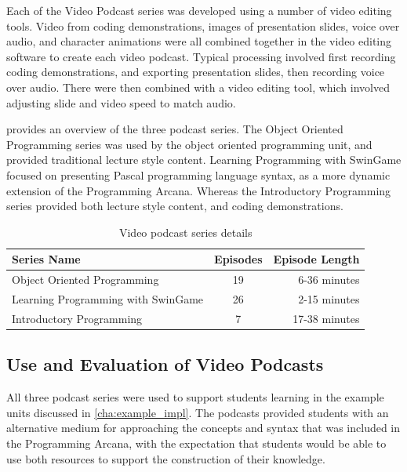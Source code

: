 Each of the Video Podcast series was developed using a number of video editing tools. Video from coding demonstrations, images of presentation slides, voice over audio, and character animations were all combined together in the video editing software to create each video podcast. Typical processing involved first recording coding demonstrations, and exporting presentation slides, then recording voice over audio. There were then combined with a video editing tool, which involved adjusting slide and video speed to match audio.

 provides an overview of the three podcast series. The Object Oriented Programming series was used by the object oriented programming unit, and provided traditional lecture style content. Learning Programming with SwinGame focused on presenting Pascal programming language syntax, as a more dynamic extension of the Programming Arcana. Whereas the Introductory Programming series provided both lecture style content, and coding demonstrations.

\begin{table}[htbp]
  \centering
  \caption{Video podcast series details}
  \label{tbl:vodcasts}
  \begin{tabular}{l|c|r}
  \textbf{Series Name} & \textbf{Episodes} & \textbf{Episode Length} \\
  \hline
  Object Oriented Programming & 19 & 6-36 minutes \\
  Learning Programming with SwinGame & 26 & 2-15 minutes \\
  Introductory Programming & 7 & 17-38 minutes \\
  \end{tabular}
\end{table}

\subsection{Use and Evaluation of Video Podcasts} %
\label{sub:use_and_evaluation_of_video_podcasts}

All three podcast series were used to support students learning in the example units discussed in \cref{cha:example_impl}. The podcasts provided students with an alternative medium for approaching the concepts and syntax that was included in the Programming Arcana, with the expectation that students would be able to use both resources to support the construction of their knowledge.

